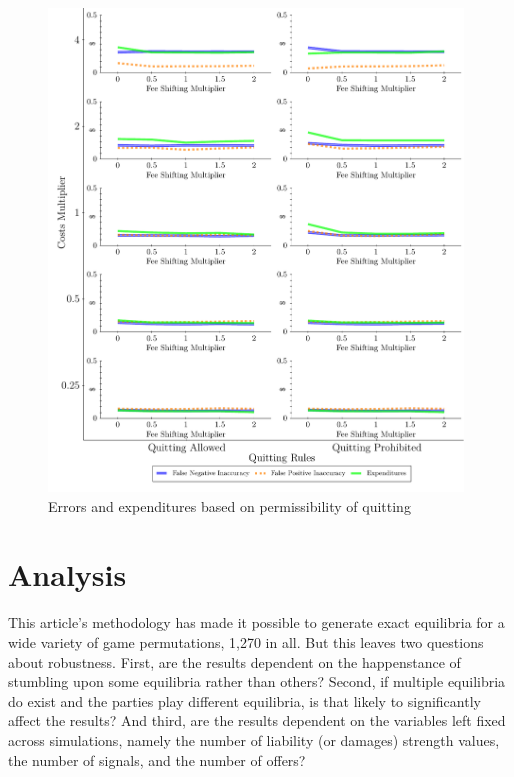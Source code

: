 \documentclass{article}
\begin{document}
\begin{figure}
\begin{minipage}{0.48\textwidth}
        \includegraphics[width=0.98\textwidth, scale=0.70, trim={0in 0in 0in 0in}, clip]{../Figures/Accuracy and Expenditures Varying Quitting Rules} %
        \caption{Errors and expenditures based on permissibility of quitting}
		\label{fig:accexp_quit}
    \end{minipage}
\end{figure}

\section{Analysis} \label{Robustness analysis}

This article's methodology has made it possible to generate exact equilibria for a wide variety of game permutations, 1,270 in all. But this leaves two questions about robustness. First, are the results dependent on the happenstance of stumbling upon some equilibria rather than others? Second, if multiple equilibria do exist and the parties play different equilibria, is that likely to significantly affect the results? And third, are the results dependent on the variables left fixed across simulations, namely the number of liability (or damages) strength values, the number of signals, and the number of offers? 
\end{document}
